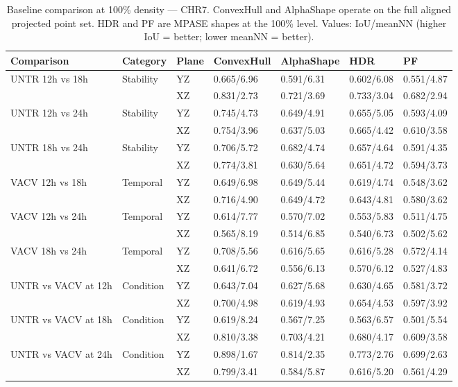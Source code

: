 \begin{table}[ht]
\centering
\small
\caption{Baseline comparison at 100\% density --- CHR7. ConvexHull and AlphaShape operate on the full aligned projected point set. HDR and PF are MPASE shapes at the 100\% level. Values: IoU/meanNN (higher IoU = better; lower meanNN = better).}
\label{tab:baseline_100_chr7}
\begin{tabular}{llllll}
\toprule
Comparison & Category & Plane & ConvexHull & AlphaShape & HDR & PF \\
\midrule
UNTR 12h vs 18h & Stability & YZ & 0.665/6.96 & 0.591/6.31 & 0.602/6.08 & 0.551/4.87 \\
 &  & XZ & 0.831/2.73 & 0.721/3.69 & 0.733/3.04 & 0.682/2.94 \\
UNTR 12h vs 24h & Stability & YZ & 0.745/4.73 & 0.649/4.91 & 0.655/5.05 & 0.593/4.09 \\
 &  & XZ & 0.754/3.96 & 0.637/5.03 & 0.665/4.42 & 0.610/3.58 \\
UNTR 18h vs 24h & Stability & YZ & 0.706/5.72 & 0.682/4.74 & 0.657/4.64 & 0.591/4.35 \\
 &  & XZ & 0.774/3.81 & 0.630/5.64 & 0.651/4.72 & 0.594/3.73 \\
VACV 12h vs 18h & Temporal & YZ & 0.649/6.98 & 0.649/5.44 & 0.619/4.74 & 0.548/3.62 \\
 &  & XZ & 0.716/4.90 & 0.649/4.72 & 0.643/4.81 & 0.580/3.62 \\
VACV 12h vs 24h & Temporal & YZ & 0.614/7.77 & 0.570/7.02 & 0.553/5.83 & 0.511/4.75 \\
 &  & XZ & 0.565/8.19 & 0.514/6.85 & 0.540/6.73 & 0.502/5.62 \\
VACV 18h vs 24h & Temporal & YZ & 0.708/5.56 & 0.616/5.65 & 0.616/5.28 & 0.572/4.14 \\
 &  & XZ & 0.641/6.72 & 0.556/6.13 & 0.570/6.12 & 0.527/4.83 \\
UNTR vs VACV at 12h & Condition & YZ & 0.643/7.04 & 0.627/5.68 & 0.630/4.65 & 0.581/3.72 \\
 &  & XZ & 0.700/4.98 & 0.619/4.93 & 0.654/4.53 & 0.597/3.92 \\
UNTR vs VACV at 18h & Condition & YZ & 0.619/8.24 & 0.567/7.25 & 0.563/6.57 & 0.501/5.54 \\
 &  & XZ & 0.810/3.38 & 0.703/4.21 & 0.680/4.17 & 0.609/3.58 \\
UNTR vs VACV at 24h & Condition & YZ & 0.898/1.67 & 0.814/2.35 & 0.773/2.76 & 0.699/2.63 \\
 &  & XZ & 0.799/3.41 & 0.584/5.87 & 0.616/5.20 & 0.561/4.29 \\
\bottomrule
\end{tabular}
\end{table}
